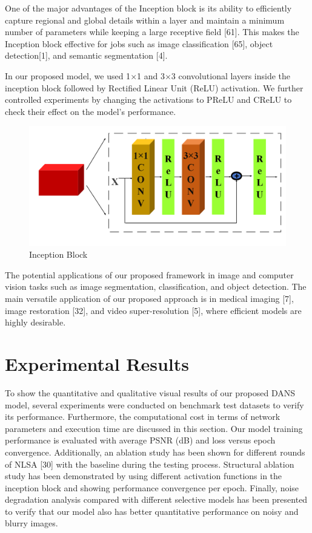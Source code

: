 \documentclass{ieeeaccess}
\begin{document}
One of the major advantages of the Inception block is its ability to efficiently capture regional and global details within a layer and maintain a minimum number of parameters while keeping a large receptive field [61]. This makes the Inception block effective for jobs such as image classification [65], object detection[1], and semantic segmentation [4].

In our proposed model, we used 1$\times$1 and 3$\times$3 convolutional layers inside the inception block followed by Rectified Linear Unit (ReLU) activation. We further controlled experiments by changing the activations to PReLU and CReLU to check their effect on the model's performance. 

\begin{figure}[ht]
  \includegraphics[width=\linewidth]{5FIGURE.pdf}
  \caption{ Inception Block }
  \label{fig:5}
\end{figure}

The potential applications of our proposed framework in image and computer vision tasks such as image segmentation, classification, and object detection. The main versatile application of our proposed approach is in medical imaging [7], image restoration [32], and video super-resolution [5], where efficient models are highly desirable. 

\section{Experimental Results}

To show the quantitative and qualitative visual results of our proposed DANS model, several experiments were conducted on benchmark test datasets to verify its performance. Furthermore, the computational cost in terms of network parameters and execution time are discussed in this section. Our model training performance is evaluated with average PSNR (dB)  and loss versus epoch convergence. Additionally, an ablation study has been shown for different rounds of NLSA [30] with the baseline during the testing process. Structural ablation study has been demonstrated by using different activation functions in the inception block and showing performance convergence per epoch. Finally, noise degradation analysis compared with different selective models has been presented to verify that our model also has better quantitative performance on noisy and blurry images.
\end{document}
